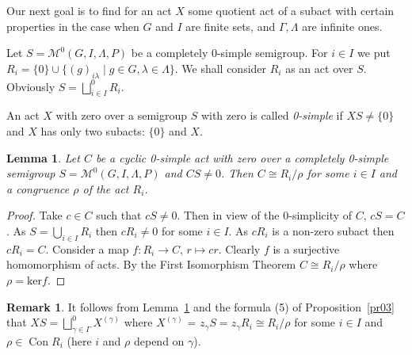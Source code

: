 \documentclass{birkau}
\numberwithin{equation}{section}
\theoremstyle{plain}
\newtheorem{lemma}[theorem]{Lemma}
\theoremstyle{definition}
\newtheorem{remark}[theorem]{Remark}
\DeclareMathOperator{\Con}{Con}
\begin{document}
	Our next goal is to find for an act $X$ some quotient act of a subact with certain properties in the case when $G$ and $I$ are finite sets, and $\Gamma, \Lambda$ are infinite ones.
	
	Let $S=\mathcal{M}^0(G,I,\Lambda,P)$ be a completely 0-simple semigroup. For $i \in I$ we put $R_i = \{0\} \cup \{(g)_{i\lambda} \mid g \in G, \lambda \in \Lambda\}$. We shall consider $R_i$ as an act over $S$. Obviously $S = \bigsqcup_{i \in I}^0 R_i$.
	
	An act $X$ with zero over a semigroup $S$ with zero is called \textit{0-simple} if $XS \neq \{0\}$ and $X$ has only two subacts: $\{0\}$ and $X$.
	
	\begin{lemma} \label{lemma:A}
	    Let $C$ be a cyclic 0-simple act with zero over a completely 0-simple semigroup $S=\mathcal{M}^0(G,I,\Lambda,P)$ and $CS \neq 0$. Then $C \cong R_i/\rho$ for some $i \in I$ and a congruence $\rho$ of the act $R_i$.
	\end{lemma}
	\begin{proof}
	    Take $c \in C$ such that $cS \neq 0$. Then in view of the 0-simplicity of $C$, $cS=C$. As $S = \bigcup_{i \in I} R_i$ then $cR_i \neq 0$ for some $i \in I$. As $cR_i$ is a non-zero subact then $cR_i = C$. Consider a map $f:R_i \to C$, $r \mapsto cr$. Clearly $f$ is a surjective homomorphism of acts. By the First Isomorphism Theorem $C \cong R_i/\rho$ where $\rho = \text{ker} f$.
	\end{proof}
	
	\begin{remark}
	    It follows from Lemma~\ref{lemma:A} and the formula (5) of Proposition~\ref{pr03} that $XS = \bigsqcup_{\gamma \in \Gamma}^{0} X^{(\gamma)}$ where $X^{(\gamma)}$ = $z_{\gamma}S = z_{\gamma}R_i \cong R_i/\rho$ for some $i \in I$ and $\rho \in \Con R_i$ (here $i$ and $\rho$ depend on $\gamma$).
	\end{remark}
	
\end{document}
